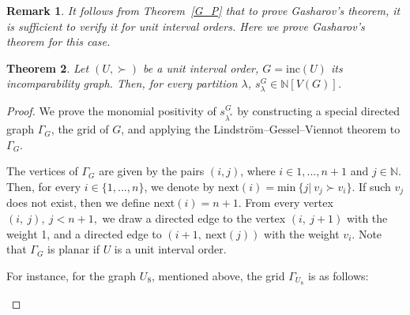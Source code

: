 \documentclass{article}
\theoremstyle{plain}
\newtheorem{thm}{Theorem}[section]
\newtheorem{remark}[thm]{Remark}
\theoremstyle{definition}
\begin{document}
\begin{remark}\label{c_m}
It follows from Theorem~\ref{G_P} that to prove Gasharov's theorem, it is sufficient to verify it for unit interval orders. Here we prove Gasharov's theorem for this case. 
\end{remark}

\begin{thm}\label{sgmpos}
  Let $(U,\succ)$ be a unit interval order, $G=\mathrm{inc}(U)$ its
  incomparability graph. Then, for every partition $\lambda$,
  $s_\lambda^G \in \mathbb{N}[V(G)]$.
\end{thm}

\begin{proof}

  We prove the monomial positivity of $s^G_{\lambda^*}$ by constructing
  a special directed graph $\Gamma_G$, the grid of $G$, and applying
  the Lindström–Gessel–Viennot theorem to $\Gamma_G$.

  The vertices of $\Gamma_G$ are given by the pairs $(i,j)$, where $i
  \in {1,...,n+1}$ and $j\in \mathbb{N}.$ Then, for every $i\in
  \{1,...,n\}$, we denote by $\mathrm{next}(i)= {\mathrm{min}}~\{j|\
  v_j\succ v_i\}$. If such $v_j$ does not exist, then we define
  $\mathrm{next}(i)=n+1$. From every vertex $(i,\ j),\ j<n+1,$ we draw a
  directed edge to the vertex $(i,\ j+1)$ with the weight 1, and a
  directed edge to $(i+1,\ \mathrm{next}(j))$ with the weight $v_i$.
  Note that $\Gamma_G$ is planar if $U$ is a unit interval order.


  For instance, for the graph $U_8$, mentioned above, the grid
  $\Gamma_{U_8}$ is as follows:

\begin{figure}[H]
\hspace*{-0.5cm} 
\end{figure}
\end{proof}
\end{document}
